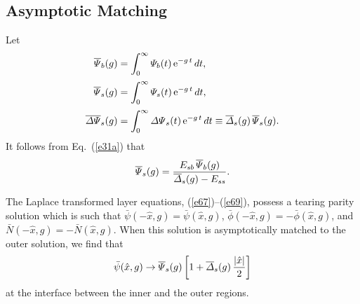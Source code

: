\documentclass[12pt,prb,aps]{revtex4-1}
\begin{document}
\subsection{Asymptotic Matching}
Let
\begin{align}
\overline{\mit\Psi}_b(g) &= \int_0^\infty {\mit\Psi}_b(t)\,{\rm e}^{-g\,t}\,dt,\label{e71}\\[0.5ex]
\overline{\mit\Psi}_s(g) &= \int_0^\infty {\mit\Psi}_s(t)\,{\rm e}^{-g\,t}\,dt,\\[0.5ex]
\overline{\mit\Delta\Psi}_s(g) &= \int_0^\infty {\mit\Delta\Psi}_s(t)\,{\rm e}^{-g\,t}\,dt \equiv \overline{\mit\Delta}_s(g)\,\overline{\mit\Psi}_s(g).\label{e73a}
\end{align}
It follows from Eq.~(\ref{e31a}) that
\begin{equation}\label{e74}
\overline{\mit\Psi}_s(g) =\frac{ E_{sb}\,\overline{\mit\Psi}_b(g)}{\overline{\mit\Delta}_s(g)-E_{ss}}.
\end{equation}

The Laplace transformed layer equations, (\ref{e67})--(\ref{e69}), possess a tearing parity solution which is such that 
$\bar{\psi}(-\hat{x},g)=\bar{\psi}(\hat{x},g)$, $\bar{\phi}(-\hat{x},g)=-\bar{\phi}(\hat{x},g)$, and $\bar{N}(-\hat{x},g)=
-\bar{N}(\hat{x},g)$.\cite{twist} When this solution is asymptotically matched to the outer solution, we find that
\begin{equation}\label{e79}
\bar{\psi}(\hat{x},g)\rightarrow \overline{\mit\Psi}_s(g)\left[1+\overline{\mit\Delta}_s(g)\,\frac{|\hat{x}|}{2}\right]
\end{equation}
at the interface between the inner and the outer regions. 
\end{document}
